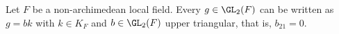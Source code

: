 Let $F$ be a non-archimedean local field. Every $g\in\GL_2(F)$ can be written as $g=bk$ with $k\in K_F$ and
$b\in\GL_2(F)$ upper triangular, that is, $b_{21}=0$.
